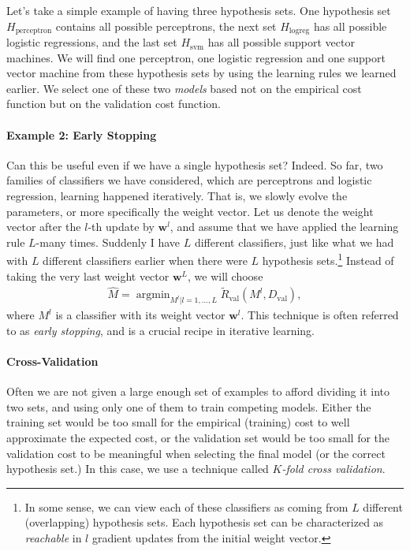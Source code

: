 \documentclass{report}
\newcommand{\vect}[1]{\mathbf{#1}}
\newcommand{\vw}[0]{\vect{w}}
\DeclareMathOperator*{\argmin}{\arg \min}
\newcommand{\val}{\text{val}}
\begin{document}
Let's take a simple example of having three hypothesis sets. One hypothesis set
$H_{\text{perceptron}}$ contains all possible perceptrons, the next set
$H_{\text{logreg}}$ has all possible logistic regressions, and the last set
$H_{\text{svm}}$ has all possible support vector machines. We will find one
perceptron, one logistic regression and one support vector machine from these
hypothesis sets by using the learning rules we learned earlier.  We select one
of these two {\it models} based not on the empirical cost function but on the
validation cost function. 

\paragraph{Example 2: Early Stopping}

Can this be useful even if we have a single hypothesis set? Indeed. So far, two
families of classifiers we have considered, which are perceptrons and logistic
regression, learning happened iteratively. That is, we slowly evolve the
parameters, or more specifically the weight vector. Let us denote the weight
vector after the $l$-th update by $\vw^l$, and assume that we have applied the
learning rule $L$-many times. Suddenly I have $L$ different classifiers, just
like what we had with $L$ different classifiers earlier when there were $L$
hypothesis sets.\footnote{
    In some sense, we can view each of these classifiers as coming from $L$
    different (overlapping) hypothesis sets. Each hypothesis set can be
    characterized as {\it reachable} in $l$ gradient updates from the initial
    weight vector.
}
Instead of taking the very last weight vector $\vw^L$, we will choose
\begin{align*}
    \hat{M} = \argmin_{M^l|l=1, \ldots, L} \tilde{R}_{\val}(M^l, D_{\val}),
\end{align*}
where $M^l$ is a classifier with its weight vector $\vw^l$. This technique is
often referred to as {\it early stopping}, and is a crucial recipe in iterative
learning. 

\paragraph{Cross-Validation}

Often we are not given a large enough set of examples to afford dividing it into
two sets, and using only one of them to train competing models. Either the
training set would be too small for the empirical (training) cost to well
approximate the expected cost, or the validation set would be too small for the
validation cost to be meaningful when selecting the final model (or the correct
hypothesis set.) In this case, we use a technique called {\it $K$-fold cross
validation}. 
\end{document}
